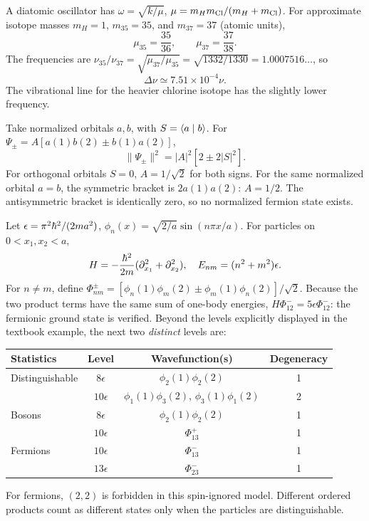 A diatomic oscillator has $\omega=\sqrt{k/\mu}$,
$\mu=m_Hm_{\rm Cl}/(m_H+m_{\rm Cl})$.
For approximate isotope masses $m_H=1$,
$m_{35}=35$, and $m_{37}=37$ (atomic units),
\begin{equation}
\mu_{35}=\frac{35}{36},\qquad
\mu_{37}=\frac{37}{38}.
\end{equation}
The frequencies are
$\nu_{35}/\nu_{37}=\sqrt{\mu_{37}/\mu_{35}}
=\sqrt{1332/1330}=1.0007516\ldots$,
so
\begin{equation}
\boxed{\Delta\nu\simeq7.51\times10^{-4}\nu}.
\end{equation}
The vibrational line for the heavier chlorine isotope
has the slightly lower frequency.

Take normalized orbitals $a,b$, with
$S=\langle a\mid b\rangle$. For
$\Psi_\pm=A[a(1)b(2)\pm b(1)a(2)]$,
\begin{equation}
\|\Psi_\pm\|^2=
|A|^2[2\pm2|S|^2].
\end{equation}
For orthogonal orbitals $S=0$,
$\boxed{A=1/\sqrt2}$ for both signs.
For the same normalized orbital $a=b$,
the symmetric bracket is $2a(1)a(2)$:
$\boxed{A=1/2}$.
The antisymmetric bracket is identically zero,
so no normalized fermion state exists.

Let $\epsilon=\pi^2\hbar^2/(2ma^2)$,
$\phi_n(x)=\sqrt{2/a}\sin(n\pi x/a)$.
For particles on $0<x_1,x_2<a$,
\begin{equation}
H=-\frac{\hbar^2}{2m}
(\partial_{x_1}^2+\partial_{x_2}^2),
\quad E_{nm}=(n^2+m^2)\epsilon.
\end{equation}
For $n\ne m$, define
$\Phi^\pm_{nm}=
[\phi_n(1)\phi_m(2)\pm\phi_m(1)\phi_n(2)]/\sqrt2$.
Because the two product terms have the same sum
of one-body energies,
$H\Phi^-_{12}=5\epsilon\Phi^-_{12}$:
the fermionic ground state is verified.
Beyond the levels explicitly displayed in the
textbook example, the next two \emph{distinct}
levels are:
\begin{center}\begin{tabular}{lccc}\toprule
Statistics&Level&Wavefunction(s)&Degeneracy\\\midrule
Distinguishable&$8\epsilon$&$\phi_2(1)\phi_2(2)$&1\\
&$10\epsilon$&$\phi_1(1)\phi_3(2)$,
$\phi_3(1)\phi_1(2)$&2\\
Bosons&$8\epsilon$&$\phi_2(1)\phi_2(2)$&1\\
&$10\epsilon$&$\Phi^+_{13}$&1\\
Fermions&$10\epsilon$&$\Phi^-_{13}$&1\\
&$13\epsilon$&$\Phi^-_{23}$&1\\\bottomrule
\end{tabular}\end{center}
For fermions, $(2,2)$ is forbidden in this
spin-ignored model. Different ordered products
count as different states only when the
particles are distinguishable.

